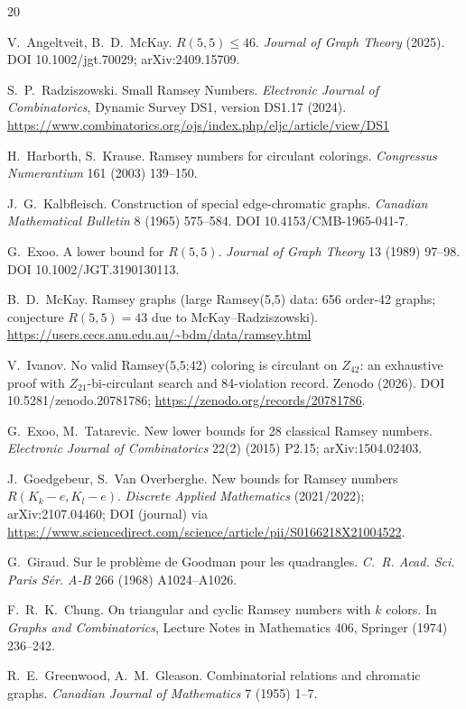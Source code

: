 \documentclass[11pt]{article}
\theoremstyle{remark}
\begin{document}
\begin{thebibliography}{20}

 V.~Angeltveit, B.~D.~McKay. $R(5,5)\le46$.
\emph{Journal of Graph Theory} (2025).  DOI 10.1002/jgt.70029;
arXiv:2409.15709.

 S.~P.~Radziszowski. Small Ramsey Numbers.
\emph{Electronic Journal of Combinatorics}, Dynamic Survey DS1, version DS1.17 (2024).
\url{https://www.combinatorics.org/ojs/index.php/eljc/article/view/DS1}

 H.~Harborth, S.~Krause. Ramsey numbers for circulant colorings.
\emph{Congressus Numerantium} 161 (2003) 139--150.

 J.~G.~Kalbfleisch. Construction of special edge-chromatic graphs.
\emph{Canadian Mathematical Bulletin} 8 (1965) 575--584.  DOI 10.4153/CMB-1965-041-7.

 G.~Exoo. A lower bound for $R(5,5)$.
\emph{Journal of Graph Theory} 13 (1989) 97--98.  DOI 10.1002/JGT.3190130113.

 B.~D.~McKay. Ramsey graphs (large Ramsey(5,5) data: 656
order-42 graphs; conjecture $R(5,5)=43$ due to McKay--Radziszowski).
\url{https://users.cecs.anu.edu.au/~bdm/data/ramsey.html}

 V.~Ivanov. No valid Ramsey(5,5;42) coloring is circulant on
$Z_{42}$: an exhaustive proof with $Z_{21}$-bi-circulant search and 84-violation
record. Zenodo (2026).  DOI 10.5281/zenodo.20781786;
\url{https://zenodo.org/records/20781786}.

 G.~Exoo, M.~Tatarevic. New lower bounds for 28 classical Ramsey
numbers. \emph{Electronic Journal of Combinatorics} 22(2) (2015) P2.15;
arXiv:1504.02403.

 J.~Goedgebeur, S.~Van Overberghe. New bounds for Ramsey numbers
$R(K_k-e,K_l-e)$. \emph{Discrete Applied Mathematics} (2021/2022);
arXiv:2107.04460; DOI (journal) via \url{https://www.sciencedirect.com/science/article/pii/S0166218X21004522}.

 G.~Giraud. Sur le probl\`eme de Goodman pour les quadrangles.
\emph{C.~R. Acad. Sci. Paris S\'er. A-B} 266 (1968) A1024--A1026.

 F.~R.~K.~Chung. On triangular and cyclic Ramsey numbers with
$k$ colors. In \emph{Graphs and Combinatorics}, Lecture Notes in Mathematics 406,
Springer (1974) 236--242.

 R.~E.~Greenwood, A.~M.~Gleason. Combinatorial relations and
chromatic graphs. \emph{Canadian Journal of Mathematics} 7 (1955) 1--7.


\end{thebibliography}
\end{document}
